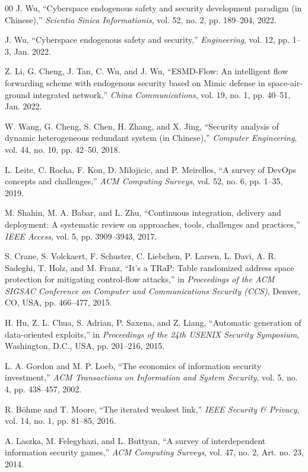 ﻿\documentclass[lettersize,journal]{IEEEtran}
\begin{document}
\begin{thebibliography}{00}
J. Wu, “Cyberspace endogenous safety and security development paradigm (in Chinese),” \textit{Scientia Sinica Informationis}, vol. 52, no. 2, pp. 189–204, 2022.

J. Wu, “Cyberspace endogenous safety and security,” \textit{Engineering}, vol. 12, pp. 1–3, Jan. 2022.

Z. Li, G. Cheng, J. Tan, C. Wu, and J. Wu, “ESMD-Flow: An intelligent flow forwarding scheme with endogenous security based on Mimic defense in space-air-ground integrated network,” \textit{China Communications}, vol. 19, no. 1, pp. 40–51, Jan. 2022.

W. Wang, G. Cheng, S. Chen, H. Zhang, and X. Jing, “Security analysis of dynamic heterogeneous redundant system (in Chinese),” \textit{Computer Engineering}, vol. 44, no. 10, pp. 42–50, 2018.

L. Leite, C. Rocha, F. Kon, D. Milojicic, and P. Meirelles, “A survey of DevOps concepts and challenges,” \textit{ACM Computing Surveys}, vol. 52, no. 6, pp. 1–35, 2019.

M. Shahin, M. A. Babar, and L. Zhu, “Continuous integration, delivery and deployment: A systematic review on approaches, tools, challenges and practices,” \textit{IEEE Access}, vol. 5, pp. 3909–3943, 2017.

S. Crane, S. Volckaert, F. Schuster, C. Liebchen, P. Larsen, L. Davi, A. R. Sadeghi, T. Holz, and M. Franz, “It's a TRaP: Table randomized address space protection for mitigating control-flow attacks,” in \textit{Proceedings of the ACM SIGSAC Conference on Computer and Communications Security (CCS)}, Denver, CO, USA, pp. 466–477, 2015.

H. Hu, Z. L. Chua, S. Adrian, P. Saxena, and Z. Liang, “Automatic generation of data-oriented exploits,” in \textit{Proceedings of the 24th USENIX Security Symposium}, Washington, D.C., USA, pp. 201–216, 2015.

L. A. Gordon and M. P. Loeb, “The economics of information security investment,” \textit{ACM Transactions on Information and System Security}, vol. 5, no. 4, pp. 438–457, 2002.

R. B\"ohme and T. Moore, “The iterated weakest link,” \textit{IEEE Security \& Privacy}, vol. 14, no. 1, pp. 81–85, 2016.

A. Laszka, M. Felegyhazi, and L. Buttyan, “A survey of interdependent information security games,” \textit{ACM Computing Surveys}, vol. 47, no. 2, Art. no. 23, 2014.


\end{thebibliography}
\end{document}
